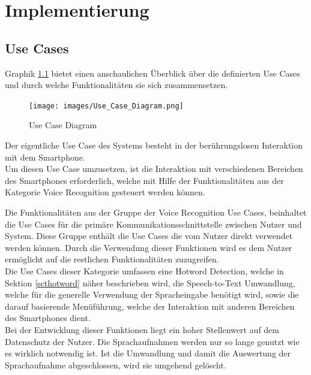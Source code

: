 \chapter{Implementierung}

\section{Use Cases}
Graphik \ref{figUseCaseDiagram} bietet einen anschaulichen Überblick über die definierten Use Cases und durch welche Funktionalitäten sie sich zusammensetzen.

\begin{figure}[h]
	\hspace*{-1.5cm}
  \texttt{[image: images/Use\_Case\_Diagram.png]}
	\caption{Use Case Diagram}
	\label{figUseCaseDiagram}
\end{figure}

Der eigentliche Use Case des Systems besteht in der berührungslosen Interaktion mit dem Smartphone.\\
Um diesen Use Case umzusetzen, ist die Interaktion mit verschiedenen Bereichen des Smartphones erforderlich, welche mit Hilfe der Funktionalitäten aus der Kategorie Voice Recognition gesteuert werden können.

Die Funktionalitäten aus der Gruppe der Voice Recognition Use Cases, beinhaltet die Use Cases für die primäre Kommunikationsschnittstelle zwischen Nutzer und System. Diese Gruppe enthält die Use Cases die vom Nutzer direkt verwendet werden können. Durch die Verwendung dieser Funktionen wird es dem Nutzer ermöglicht auf die restlichen Funktionalitäten zuzugreifen.\\
Die Use Cases dieser Kategorie umfassen eine Hotword Detection, welche in Sektion \ref{scthotword} näher beschrieben wird, die Speech-to-Text Umwandlung, welche für die generelle Verwendung der Spracheingabe benötigt wird, sowie die darauf basierende Menüführung, welche der Interaktion mit anderen Bereichen des Smartphones dient.\\
Bei der Entwicklung dieser Funktionen liegt ein hoher Stellenwert auf dem Datenschutz der Nutzer. Die Sprachaufnahmen werden nur so lange genutzt wie es wirklich notwendig ist. Ist die Umwandlung und damit die Auswertung der Sprachaufnahme abgeschlossen, wird sie umgehend gelöscht.

